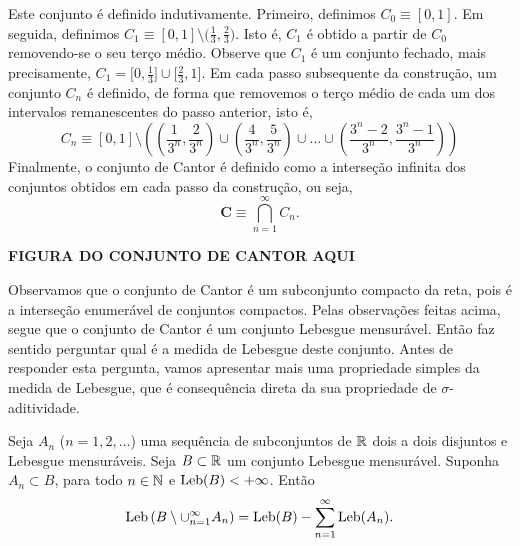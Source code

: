         Este conjunto é definido indutivamente. Primeiro,
        definimos $C_0 \equiv [0,1]$. Em seguida,
        definimos 
        $C_1\equiv[0,1]\setminus \big(\frac{1}{3},\frac{2}{3}\big)$.
        Isto é, $C_1$ é obtido a partir de $C_0$ 
        removendo-se o seu terço médio. 
        Observe que $C_1$ é um conjunto fechado, mais precisamente, 
        $C_1 = \big[0,\frac{1}{3}\big] \cup \big[\frac{2}{3},1\big]$.  
        Em cada passo subsequente da construção, um conjunto $C_n$ é definido, 
        de forma que removemos o terço médio de cada um dos intervalos 
        remanescentes do passo anterior, isto é,
        \begin{equation}
        \label{def-construcao-cn-cantor}
            C_n
            \equiv
            [0,1]\setminus
            \left( 
                \left( \frac{1}{3^n},\frac{2}{3^n} \right) \cup
                \left( \frac{4}{3^n},\frac{5}{3^n} \right) \cup\ldots\cup
                \left( \frac{3^n-2}{3^n},\frac{3^n-1}{3^n} \right)
            \right)
        \end{equation}
        Finalmente, o conjunto de Cantor
        é definido como a interseção infinita dos conjuntos obtidos em cada
        passo da construção, ou seja,
        \[
            \mathbf{C} \equiv \bigcap_{n=1}^{\infty} C_n.
        \]
        \begin{center}
            \textbf{FIGURA DO CONJUNTO DE CANTOR AQUI}
        \end{center}
        Observamos que o conjunto de Cantor é um subconjunto compacto da reta, 
        pois é a interseção enumerável de conjuntos compactos.
        Pelas observações feitas acima, segue que o conjunto de Cantor é um 
        conjunto Lebesgue mensurável. Então faz sentido perguntar qual é a 
        medida de Lebesgue deste conjunto. Antes de responder esta pergunta,
        vamos apresentar mais uma propriedade simples da medida de Lebesgue,
        que é consequência direta da sua propriedade de $\sigma$-aditividade.
        \begin{proposicao}
        \label{prop-Leb-diferenca}
            Seja $A_n$ ($n=1,2,\ldots$) uma sequência de subconjuntos de 
            $\mathbb{R}$ dois a dois disjuntos e Lebesgue mensuráveis. 
            Seja $B\subset \mathbb{R}$ um conjunto Lebesgue mensurável. Suponha
            $A_n\subset B$, para todo $n\in\mathbb{N}$ e $\mathrm{Leb}(B)<+\infty$. Então 
            \[
                \mathrm{Leb}\left(B\setminus \cup_{n=1}^{\infty} A_n \right) 
                = 
                \mathrm{Leb}(B) - \sum_{n=1}^{\infty}\mathrm{Leb}(A_n).
            \]
        \end{proposicao}
